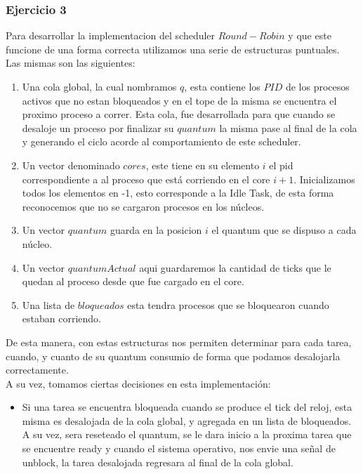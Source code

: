 \subsubsection[Resolución Ejercicio 3]{Ejercicio 3}
Para desarrollar la implementacion del scheduler $Round-Robin$ y que este funcione de una forma correcta
utilizamos una serie de estructuras puntuales. \\
Las mismas son las siguientes:\\
\begin{enumerate}
 \item Una cola global, la cual nombramos $q$, esta contiene los $PID$ de los procesos activos que no estan
 bloqueados y en el tope de la misma se encuentra el proximo proceso a correr. Esta cola,
 fue desarrollada para que cuando se desaloje un proceso por finalizar su $quantum$ la misma pase al final de
 la cola y generando el ciclo acorde al comportamiento de este scheduler.
 \item Un vector denominado $cores$, este tiene en su elemento $i$ el pid correspondiente a
al proceso que está corriendo en el core $i+1$. Inicializamos todos los elementos en -1, esto
corresponde a la Idle Task, de esta forma reconocemos que no se cargaron procesos en los núcleos.
\item Un vector $quantum$ guarda en la posicion $i$ el quantum que se dispuso a cada núcleo.
\item Un vector $quantumActual$ aqui guardaremos la cantidad de ticks que le quedan al proceso
desde que fue cargado en el core.
\item Una lista de $bloqueados$ esta tendra procesos que se bloquearon cuando estaban corriendo.
\end{enumerate}

De esta manera, con estas estructuras nos permiten determinar para cada tarea, cuando, y cuanto 
de su quantum consumio de forma que podamos desalojarla correctamente.\\

A su vez, tomamos ciertas decisiones en esta implementación:
\begin{itemize}
 \item Si una tarea se encuentra bloqueada cuando se produce el tick del reloj, esta misma es desalojada
de la cola global, y agregada en un lista de bloqueados. A su vez, sera reseteado el quantum, se le
dara inicio a la proxima tarea que se encuentre ready y cuando el sistema operativo, nos envie una
señal de unblock, la tarea desalojada regresara al final de la cola global.

\end{itemize}


